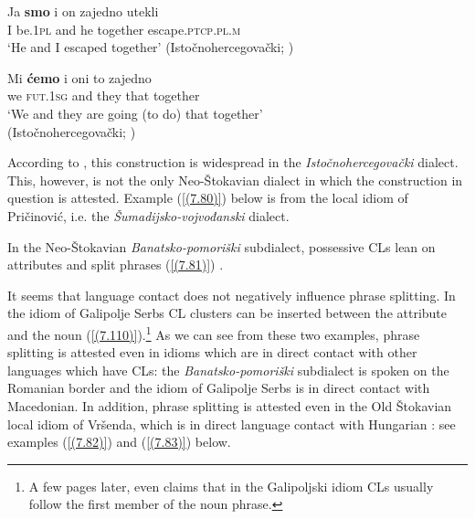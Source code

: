 \begin{exe}\ex\label{(7.78)}
\gll Ja  \textbf{smo}  i  on  zajedno  utekli  \\
I be.1\textsc{pl}  and  he together escape.\textsc{ptcp.pl.m} \\
\glt ‘He and I escaped together’
\hfill  (Istočnohercegovački; \citealt[67]{Okuka08})

\ex\label{(7.79)}
\gll Mi  \textbf{ćemo}  i  oni  to  zajedno  \\
we \textsc{fut}.\textsc{1sg}  and they that together \\
\glt ‘We and they are going (to do) that together’ \\
\hfill  (Istočnohercegovački; \citealt[67]{Okuka08})
\end{exe}

\noindent According to \citet[67]{Okuka08}, this construction is widespread in the \textit{Istočnohercegovački} dialect. This, however, is not the only Neo-Štokavian dialect in which the construction in question is attested. Example (\ref{(7.80)}) below is from the local idiom of Pričinović, i.e. the \textit{Šumadijsko-vojvođanski} dialect. 


\noindent In the Neo-Štokavian \textit{Banatsko-pomoriški} subdialect, possessive CLs lean on attributes and split phrases (\ref{(7.81)}) \citep[cf.][148]{Okuka08}. 


\noindent It seems that language contact does not negatively influence phrase splitting. In the idiom of Galipolje Serbs CL clusters can be inserted between the attribute and the noun (\ref{(7.110)}).\footnote{A few pages later, \citet[397]{Ivic57} even claims that in the Galipoljski idiom CLs usually follow the first member of the noun phrase.} As we can see from these two examples, phrase splitting is attested even in idioms which are in direct contact with other languages which have CLs: the \textit{Banatsko-pomoriški} subdialect is spoken on the Romanian border and the idiom of Galipolje Serbs is in direct contact with Macedonian. In addition, phrase splitting is attested even in the Old Štokavian local idiom of Vršenda, which is in direct language contact with Hungarian \citep[cf.][111f]{Gorjanac11}: see examples (\ref{(7.82)}) and (\ref{(7.83)}) below.

